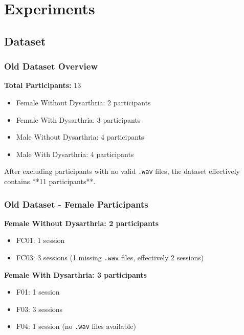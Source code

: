 \section{Experiments}

\subsection{Dataset}
\begin{frame}
    \frametitle{Old Dataset Overview}
    \textbf{Total Participants:} 13  
    \begin{itemize}
        \item Female Without Dysarthria: 2 participants
        \item Female With Dysarthria: 3 participants
        \item Male Without Dysarthria: 4 participants
        \item Male With Dysarthria: 4 participants
    \end{itemize}
    After excluding participants with no valid \texttt{.wav} files, the dataset effectively contains **11 participants**.
\end{frame}

\begin{frame}
    \frametitle{Old Dataset - Female Participants}
    \textbf{Female Without Dysarthria: 2 participants}
    \begin{itemize}
        \item FC01: 1 session
        \item FC03: 3 sessions (1 missing \texttt{.wav} files, effectively 2 sessions)
    \end{itemize}
    
    \textbf{Female With Dysarthria: 3 participants}
    \begin{itemize}
        \item F01: 1 session
        \item F03: 3 sessions
        \item F04: 1 session (no \texttt{.wav} files available)
    \end{itemize}
\end{frame}


